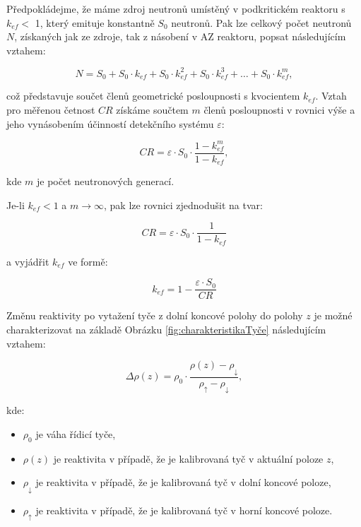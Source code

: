 Předpokládejme, že máme zdroj neutronů umístěný v podkritickém reaktoru s $k_{ef} <$  1, který emituje konstantně $S_0$ neutronů. Pak lze celkový počet neutronů $N$, získaných jak ze zdroje, tak z násobení v AZ reaktoru, popsat následujícím vztahem:

\begin{equation*}
N = S_0 + S_0 \cdot k_{ef} + S_0 \cdot k_{ef}^2 + S_0 \cdot k_{ef}^3 + \ldots + S_0 \cdot k_{ef}^m,
\end{equation*}

což představuje součet členů geometrické posloupnosti s kvocientem $k_{ef}$. Vztah pro měřenou četnost $CR$ získáme součtem $m$ členů posloupnosti v rovnici výše a jeho vynásobením účinností detekčního systému $\varepsilon$:

\begin{equation*}
CR = \varepsilon \cdot S_0 \cdot \frac{1 - k_{ef}^m}{1 - k_{ef}},
\end{equation*}

kde $m$ je počet neutronových generací.

Je-li $ k_{ef} < 1 $ a $ m \rightarrow \infty $, pak lze rovnici zjednodušit na tvar:

\begin{equation*}
CR = \varepsilon \cdot S_0 \cdot \frac{1}{1 - k_{ef}}
\end{equation*}

a vyjádřit $ k_{ef} $ ve formě:

\begin{equation*}
k_{ef} = 1 - \frac{\varepsilon \cdot S_0}{CR}
\end{equation*}

Změnu reaktivity po vytažení tyče z dolní koncové polohy do polohy $ z $ je možné charakterizovat na základě Obrázku \ref{fig:charakteristikaTyče} následujícím vztahem:

\begin{equation*}
\Delta \rho(z) = \rho_0 \cdot \frac{ \rho(z) - \rho_\downarrow}{\rho_\uparrow - \rho_\downarrow},
\end{equation*}

kde:

\begin{itemize}%
    \item $\rho_0$ je váha řídicí tyče,
    \item $\rho(z)$ je reaktivita v případě, že je kalibrovaná tyč v aktuální poloze $ z $,
    \item $\rho_\downarrow$ je reaktivita v případě, že je kalibrovaná tyč v dolní koncové poloze,%
    \item $\rho_\uparrow$ je reaktivita v případě, že je kalibrovaná tyč v horní koncové poloze.%
\end{itemize}

